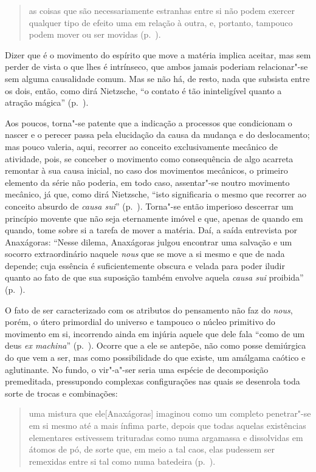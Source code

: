 \begin{quote} 
as coisas que são necessariamente estranhas entre si não
 podem exercer qualquer tipo de efeito uma em relação à outra, e, portanto,
 tampouco podem mover ou ser movidas (p.~\pageref{coisasquesao}).
\end{quote} 

Dizer que é o movimento do espírito que move a matéria implica aceitar, mas
sem perder de vista o que lhes é intrínseco, que ambos jamais poderiam
relacionar"-se sem alguma causalidade comum. Mas se não há, de resto, nada
que subsista entre os dois, então, como dirá Nietzsche, ``o contato é tão
ininteligível quanto a atração mágica'' (p.~\pageref{ocontatoe}).

Aos poucos, torna"-se patente que a indicação a processos que condicionam o
nascer e o perecer passa pela elucidação da causa da mudança e do
deslocamento; mas pouco valeria, aqui, recorrer ao conceito exclusivamente
mecânico de atividade, pois, se conceber o movimento como consequência de
algo acarreta remontar à sua causa inicial, no caso dos movimentos mecânicos,
o primeiro elemento da série não poderia, em todo caso, assentar"-se noutro
movimento mecânico, já que, como dirá Nietzsche, ``isto significaria o mesmo
que recorrer ao conceito absurdo de \textit{causa sui}'' (p.~\pageref{causasui}). 
Torna"-se então imperioso descerrar um princípio movente que não
seja eternamente imóvel e que, apenas de quando em quando, tome sobre si a
tarefa de mover a matéria. Daí, a saída entrevista por Anaxágoras: ``Nesse
dilema, Anaxágoras julgou encontrar uma salvação e um socorro extraordinário
naquele \textit{nous} que se move a si mesmo e que de nada depende; cuja
essência é suficientemente obscura e velada para poder iludir quanto ao fato
de que sua suposição também envolve aquela \textit{causa sui} proibida''
(p.~\pageref{nessedilema}).

O fato de ser caracterizado com os atributos do pensamento não faz do
\textit{nous}, porém,\textit{ }o útero primordial do universo e tampouco o
 núcleo primitivo do movimento em si, incorrendo ainda em injúria aquele que
 dele fala ``como de um deus \textit{ex machina}'' (p.~\pageref{exmachina}). 
 Ocorre que a ele se antepõe, não como posse demiúrgica do que
 vem a ser, mas como possibilidade do que existe, um amálgama caótico e
 aglutinante. No fundo, o vir"-a"-ser seria uma espécie de decomposição
 premeditada, pressupondo complexas configurações nas quais se desenrola toda
 sorte de trocas e combinações: 

\begin{quote} uma mistura que ele[Anaxágoras] imaginou como um completo
 penetrar"-se em si mesmo até a mais ínfima parte, depois que todas aquelas
 existências elementares estivessem trituradas como numa argamassa e
 dissolvidas em átomos de pó, de sorte que, em meio a tal caos, elas pudessem
 ser remexidas entre si tal como numa batedeira (p.~\pageref{mistura}).
\end{quote} 

